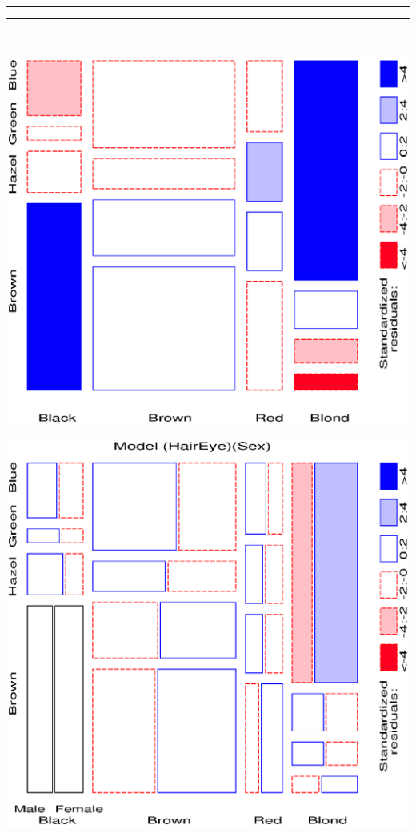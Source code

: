 \begin{center}
 \rule[-4pt]{0.5pt}{4pt}\hrulefill\rule[-4pt]{0.5pt}{4pt}\\
 \begin{minipage}[c]{.33\linewidth}
  \includegraphics[width=1\linewidth]{ch4/fig/mosaic34}
 \end{minipage}%
 \hfill
 \begin{minipage}[c]{.33\linewidth}
  \includegraphics[width=1\linewidth]{ch4/fig/mosaic35}

\end{minipage}
\end{center}
